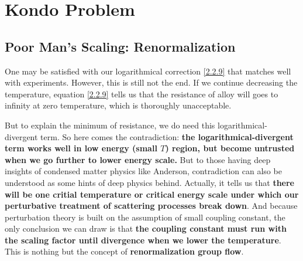 \documentclass[aps,prx,superscriptaddress,onecolumn,preprintnumbers,nofootinbib,longbibliography]{revtex4-1}
\begin{document}
\section{Kondo Problem}
	\subsection{Poor Man's Scaling: Renormalization}
		One may be satisfied with our logarithmical correction \eqref{2.2.9} that matches well with experiments. However, this is still not the end. If we continue decreasing the temperature, equation \eqref{2.2.9} tells us that the resistance of alloy will goes to infinity at zero temperature, which is thoroughly unacceptable.\par
		But to explain the minimum of resistance, we do need this logarithmical-divergent term. So here comes the contradiction: \textbf{the logarithmical-divergent term works well in low energy (small $T$) region, but become untrusted when we go further to lower energy scale.} But to those having deep insights of condensed matter physics like Anderson, contradiction can also be understood as some hints of deep physics behind. Actually, it tells us that {\color{red}\textbf{there will be one critial temperature or critical energy scale under which our perturbative treatment of scattering processes break down}}. And because perturbation theory is built on the assumption of small coupling constant, the only conclusion we can draw is that {\color{red}\textbf{the coupling constant must run with the scaling factor until divergence when we lower the temperature}}. This is nothing but the concept of \textbf{renormalization group flow}.
		
\end{document}
